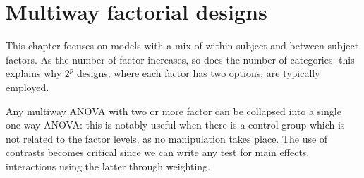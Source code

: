 \documentclass[
  11pt,
  letterpaper,
]{scrbook}
\theoremstyle{definition}
\theoremstyle{definition}
\theoremstyle{remark}
\begin{document}

\chapter{Multiway factorial designs}\label{multiway-factorial-designs}

This chapter focuses on models with a mix of within-subject and
between-subject factors. As the number of factor increases, so does the
number of categories: this explains why \(2^p\) designs, where each
factor has two options, are typically employed.

Any multiway ANOVA with two or more factor can be collapsed into a
single one-way ANOVA: this is notably useful when there is a control
group which is not related to the factor levels, as no manipulation
takes place. The use of contrasts becomes critical since we can write
any test for main effects, interactions using the latter through
weighting.
\end{document}
